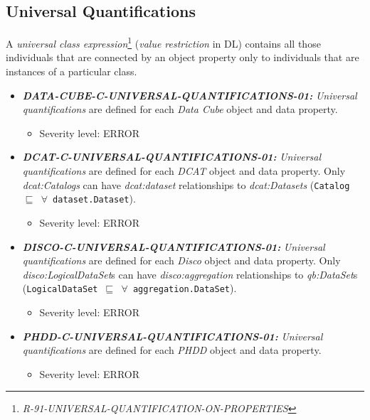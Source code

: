 \documentclass{llncs}
\newcommand{\ms}[1]{\texttt{#1}}
\begin{document}
\subsection{Universal Quantifications}

A \emph{universal class expression}\footnote{{\em R-91-UNIVERSAL-QUANTIFICATION-ON-PROPERTIES}} ({\em value restriction} in DL) contains all those individuals that are connected by an object property only to individuals that are instances of a particular class.

\begin{itemize}
	\item \textbf{{\em DATA-CUBE-C-UNIVERSAL-QUANTIFICATIONS-01:}}
	\emph{Universal quantifications} are defined for each \emph{Data Cube} object and data property.
	\begin{itemize}
		\item Severity level: ERROR
	\end{itemize}
\end{itemize}

\begin{itemize}
	\item \textbf{{\em DCAT-C-UNIVERSAL-QUANTIFICATIONS-01:}}
	\emph{Universal quantifications} are defined for each \emph{DCAT} object and data property.
	Only {\em dcat:Catalogs} can have {\em dcat:dataset} relationships to {\em dcat:Datasets} (\ms{Catalog $\sqsubseteq$ $\forall$ dataset.Dataset}).
	\begin{itemize}
		\item Severity level: ERROR
	\end{itemize}
\end{itemize}

\begin{itemize}
	\item \textbf{{\em DISCO-C-UNIVERSAL-QUANTIFICATIONS-01:}}
	\emph{Universal quantifications} are defined for each \emph{Disco} object and data property.
  Only {\em disco:LogicalDataSet}s can have {\em disco:aggregation} relationships to {\em qb:DataSet}s (\ms{LogicalDataSet $\sqsubseteq$ $\forall$ aggregation.DataSet}).
	\begin{itemize}
		\item Severity level: ERROR
	\end{itemize}
\end{itemize}

\begin{itemize}
	\item \textbf{{\em PHDD-C-UNIVERSAL-QUANTIFICATIONS-01:}}
	\emph{Universal quantifications} are defined for each \emph{PHDD} object and data property.
	\begin{itemize}
		\item Severity level: ERROR
	\end{itemize}
\end{itemize}
\end{document}
